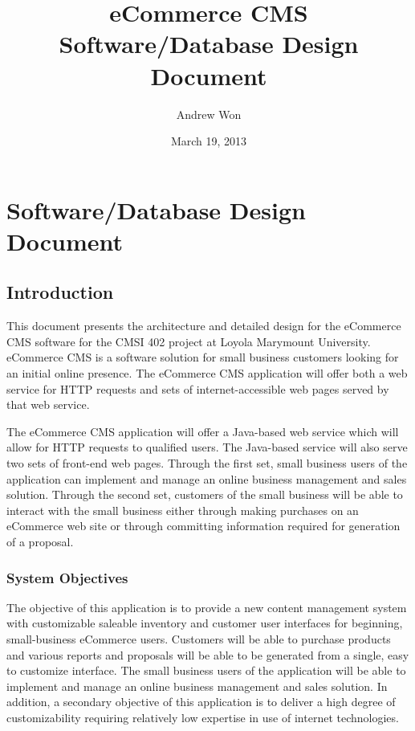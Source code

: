 \documentclass{article}
\title{eCommerce CMS Software/Database Design Document}
\author{Andrew Won}
\date{March 19, 2013}
\begin{document}
\maketitle
\tableofcontents
\listoftables
\listoffigures

\pagebreak
\setcounter{section}{5}
\section{Software/Database Design Document}

\subsection{Introduction}

This document presents the architecture and detailed design for the eCommerce CMS
software for the CMSI 402 project at Loyola Marymount University.  eCommerce CMS
is a software solution for small business customers looking for
an initial online presence.  The eCommerce CMS application will offer both a
web service for HTTP requests and sets of internet-accessible web pages served
by that web service.

The eCommerce CMS application will offer a Java-based web service which will
allow for HTTP requests to qualified users.  The Java-based service will also
serve two sets of front-end web pages.  Through the first set, small business
users of the application can implement and manage an online business management
and sales solution. Through the second set, customers of the small business will
be able to interact with the small business either through making purchases on
an eCommerce web site or through committing information required for generation
of a proposal.

\subsubsection{System Objectives}

The objective of this application is to provide a new content management
system with customizable saleable inventory and customer user interfaces for
beginning, small-business eCommerce users.  Customers will be able to purchase
products and various reports and proposals will
be able to be generated from a single, easy to customize interface.  The
small business users of the application will be able to implement and manage
an online business management and sales solution.  In
addition, a secondary objective of this application is to deliver a high degree
of customizability requiring relatively low expertise in use of internet
technologies.
\end{document}
